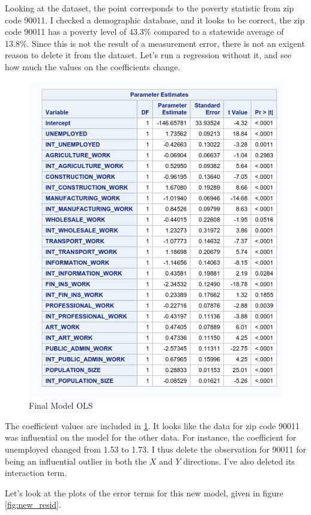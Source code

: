 Looking at the dataset, the point corresponds to the poverty statistic from zip code 90011. I checked a demographic database, and it looks to be correct, the zip code 90011 has a poverty level of 43.3\% compared to a statewide average of 13.8\%. Since this is not the result of a measurement error, there is not an exigent reason to delete it from the dataset. Let's run a regression without it, and see how much the values on the coefficients change. 


\begin{figure}
\centering
\includegraphics{Chapters/final_model.png}
\caption{Final Model OLS}
\label{fig:final_model}
\end{figure}

The coefficient values are included in \ref{fig:final_model}. It looks like the data for zip code 90011 was influential on the model for the other data. For instance, the coefficient for unemployed changed from 1.53 to 1.73. I thus delete the observation for 90011 for being an influential outlier in both the $X$ and $Y$ directions. I've also deleted its interaction term. 

Let's look at the plots of the error terms for this new model, given in figure \ref{fig:new_resid}. 

